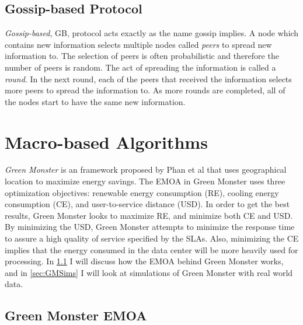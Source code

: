 \documentclass{sig-alternate}
\begin{document}
\subsection{Gossip-based Protocol}
\label{sec:GBP}

\emph{Gossip-based}, GB, protocol acts exactly as the name gossip implies. A node which contains new information selects multiple nodes called \emph{peers} to spread new information to. The selection of peers is often probabilistic and therefore the number of peers is random. The act of spreading the information is called a \emph{round}. In the next round, each of the peers that received the information selects more peers to spread the information to. As more rounds are completed, all of the nodes start to have the same new information.~\cite{Yanggratoke}


\section{Macro-based Algorithms}
\label{sec:MacAL}

\emph{Green Monster}
is an framework proposed by Phan et al that uses geographical location to maximize energy savings. The EMOA in Green Monster uses three optimization objectives: renewable energy consumption (RE), cooling energy consumption (CE), and user-to-service distance (USD). In order to get the best results, Green Monster looks to maximize RE, and minimize both CE and USD. By minimizing the USD, Green Monster attempts to minimize the response time to assure a high quality of service specified by the SLAs. Also, minimizing the CE implies that the energy consumed in the data center will be more heavily used for processing. In \ref{sec:GMEMOA} I will discuss how the EMOA behind Green Monster works, and in \ref{sec:GMSims} I will look at simulations of Green Monster with real world data.

\subsection{Green Monster EMOA}
\label{sec:GMEMOA}
\end{document}
